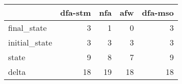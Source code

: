 \begin{tabular}{lrrrr}
\toprule
{} &  dfa-stm &  nfa &  afw &  dfa-mso \\
\midrule
final\_state   &        3 &    1 &    0 &        3 \\
initial\_state &        3 &    3 &    3 &        3 \\
state         &        9 &    8 &    7 &        9 \\
delta         &       18 &   19 &   18 &       18 \\
\bottomrule
\end{tabular}
